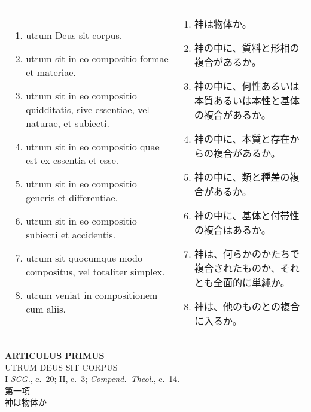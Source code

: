 \documentclass[10pt]{jsarticle}
\begin{document}
\begin{longtable}{p{21em}p{21em}}
\begin{enumerate}
 \item utrum Deus sit corpus.
 \item utrum sit in eo compositio formae et materiae. 
 \item utrum sit in eo compositio quidditatis, sive
essentiae, vel naturae, et subiecti.
 \item utrum sit in eo compositio quae est ex essentia et esse.
 \item utrum sit in eo compositio generis et differentiae. 
 \item utrum sit in eo compositio subiecti et accidentis.
 \item utrum sit quocumque modo compositus, vel totaliter
simplex.
 \item utrum veniat in compositionem cum aliis.
\end{enumerate}

&

\begin{enumerate}
 \item 神は物体か。
 \item 神の中に、質料と形相の複合があるか。
 \item 神の中に、何性あるいは本質あるいは本性と基体の複合があるか。
 \item 神の中に、本質と存在からの複合があるか。
 \item 神の中に、類と種差の複合があるか。
 \item 神の中に、基体と付帯性の複合はあるか。
 \item 神は、何らかのかたちで複合されたものか、それとも全面的に単純か。
 \item 神は、他のものとの複合に入るか。
\end{enumerate}


\end{longtable}

\newpage
{}
\begin{center}
 {\Large {\bf ARTICULUS PRIMUS}}\\
 {\large UTRUM DEUS SIT CORPUS}\\
 {\footnotesize I {\it SCG.}, c.~20; II, c.~3; {\it Compend.~Theol.},
 c.~14.}\\
{\Large 第一項\\神は物体か}
\end{center}
\end{document}

